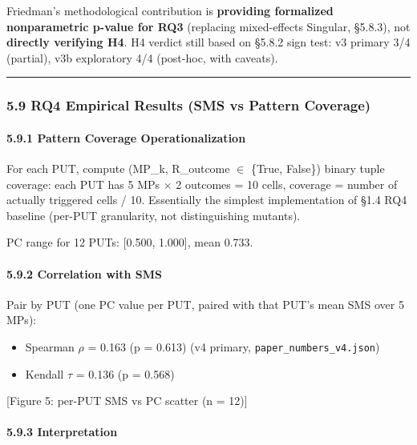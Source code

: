 \documentclass[review,12pt,authoryear]{elsarticle}
\providecommand{\tightlist}{\setlength{\itemsep}{0pt}\setlength{\parskip}{0pt}}
\begin{document}
Friedman's methodological contribution is \textbf{providing formalized
nonparametric p-value for RQ3} (replacing mixed-effects Singular,
§5.8.3), not \textbf{directly verifying H4}. H4 verdict still based on
§5.8.2 sign test: v3 primary 3/4 (partial), v3b exploratory 4/4
(post-hoc, with caveats).

\begin{center}\rule{0.5\linewidth}{0.5pt}\end{center}

\subsubsection{5.9 RQ4 Empirical Results (SMS vs Pattern
Coverage)}\label{rq4-empirical-results-sms-vs-pattern-coverage}

\paragraph{5.9.1 Pattern Coverage
Operationalization}\label{pattern-coverage-operationalization}

For each PUT, compute (MP\_k, R\_outcome $\in$ \{True, False\}) binary tuple
coverage: each PUT has 5 MPs $\times$ 2 outcomes = 10 cells, coverage = number
of actually triggered cells / 10. Essentially the simplest
implementation of §1.4 RQ4 baseline (per-PUT granularity, not
distinguishing mutants).

PC range for 12 PUTs: {[}0.500, 1.000{]}, mean 0.733.

\paragraph{5.9.2 Correlation with SMS}\label{correlation-with-sms}

Pair by PUT (one PC value per PUT, paired with that PUT's mean SMS over
5 MPs):

\begin{itemize}
\tightlist
\item
  Spearman $\rho$ = 0.163 (p = 0.613) (v4 primary,
  \texttt{paper\_numbers\_v4.json})
\item
  Kendall $\tau$ = 0.136 (p = 0.568)
\end{itemize}

{[}Figure 5: per-PUT SMS vs PC scatter (n = 12){]}

\paragraph{5.9.3 Interpretation}\label{interpretation}
\end{document}
